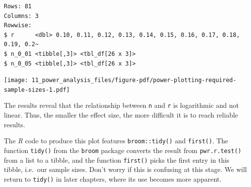\documentclass[
  letterpaper,
]{krantz}
\makeatletter
\newenvironment{Shaded}{\begin{snugshade}}{\end{snugshade}}
\newcommand{\AttributeTok}[1]{\textcolor[rgb]{0.40,0.45,0.13}{#1}}
\newcommand{\CommentTok}[1]{\textcolor[rgb]{0.37,0.37,0.37}{#1}}
\newcommand{\FunctionTok}[1]{\textcolor[rgb]{0.28,0.35,0.67}{#1}}
\newcommand{\NormalTok}[1]{\textcolor[rgb]{0.00,0.23,0.31}{#1}}
\newcommand{\SpecialCharTok}[1]{\textcolor[rgb]{0.37,0.37,0.37}{#1}}
\newcommand{\StringTok}[1]{\textcolor[rgb]{0.13,0.47,0.30}{#1}}
\newenvironment{kframe}{%
\medskip{}
\setlength{\fboxsep}{.8em}
 \def\at@end@of@kframe{}%
 \ifinner\ifhmode%
  \def\at@end@of@kframe{\end{minipage}}%
  \begin{minipage}{\columnwidth}%
 \fi\fi%
 \def\FrameCommand##1{\hskip\@totalleftmargin \hskip-\fboxsep
 \colorbox{shadecolor}{##1}\hskip-\fboxsep
     \hskip-\linewidth \hskip-\@totalleftmargin \hskip\columnwidth}%
 \MakeFramed {\advance\hsize-\width
   \@totalleftmargin\z@ \linewidth\hsize
   \@setminipage}}%
 {\par\unskip\endMakeFramed%
 \at@end@of@kframe}
\renewenvironment{Shaded}{\begin{kframe}}{\end{kframe}}
\makeatother
\begin{document}
\begin{verbatim}
Rows: 81
Columns: 3
Rowwise: 
$ r      <dbl> 0.10, 0.11, 0.12, 0.13, 0.14, 0.15, 0.16, 0.17, 0.18, 0.19, 0.2~
$ n_0_01 <tibble[,3]> <tbl_df[26 x 3]>
$ n_0_05 <tibble[,3]> <tbl_df[26 x 3]>
\end{verbatim}

\begin{Shaded}
\end{Shaded}

\texttt{[image: 11\_power\_analysis\_files/figure-pdf/power-plotting-required-sample-sizes-1.pdf]}

The results reveal that the relationship between \texttt{n} and
\texttt{r} is logarithmic and not linear. Thus, the smaller the effect
size, the more difficult it is to reach reliable results.

The \emph{R} code to produce this plot features \texttt{broom::tidy()}
and \texttt{first()}. The function \texttt{tidy()} from the
\texttt{broom} package converts the result from \texttt{pwr.r.test()}
from a list to a tibble, and the function \texttt{first()} picks the
first entry in this tibble, i.e.~our sample sizes. Don't worry if this
is confusing at this stage. We will return to \texttt{tidy()} in later
chapters, where its use becomes more apparent.
\end{document}
